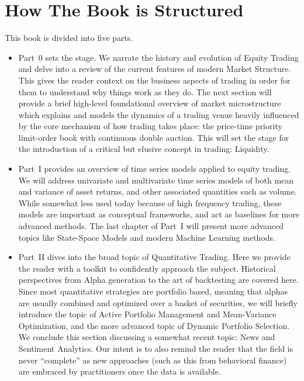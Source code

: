 \section{How The Book is Structured}

This book is divided into five parts. 

\begin{itemize}
\item Part~0 sets the stage. We narrate the history and evolution of Equity Trading and delve into a review of the current features of modern Market Structure. This gives the reader context on the business aspects of trading in order for them to understand why things work as they do. The next section will provide a brief high-level foundational overview of market microstructure which explains and models the dynamics of a trading venue heavily influenced by the core mechanism of how trading takes place: the price-time priority limit-order book with continuous double auction. This will set the stage for the introduction of a critical but elusive concept in trading: Liquidity.

\item Part~I provides an overview of time series models applied to equity trading. We will address univariate and multivariate time series models of both mean and variance of asset returns, and other associated quantities such as volume. While somewhat less used today because of high frequency trading, these models are important  as conceptual frameworks, and act as baselines for more advanced methods. The last chapter of Part~I will present more advanced topics like State-Space Models and modern Machine Learning methods.

\item Part~II dives into the broad topic of Quantitative Trading. Here we provide the reader with a toolkit to confidently approach the subject. Historical perspectives from Alpha generation to the art of backtesting are covered here. Since most quantitative strategies are portfolio based, meaning that alphas are usually combined  and optimized over a basket of securities, we will briefly introduce the topic of Active Portfolio Management and Mean-Variance Optimization, and the more advanced topic of Dynamic Portfolio Selection. We conclude this section discussing a somewhat recent topic:  News and Sentiment Analytics. Our intent is to also remind the reader that the field is never ``complete'' as new approaches (such as this from behavioral finance) are embraced by practitioners once the data is available.


\end{itemize}
